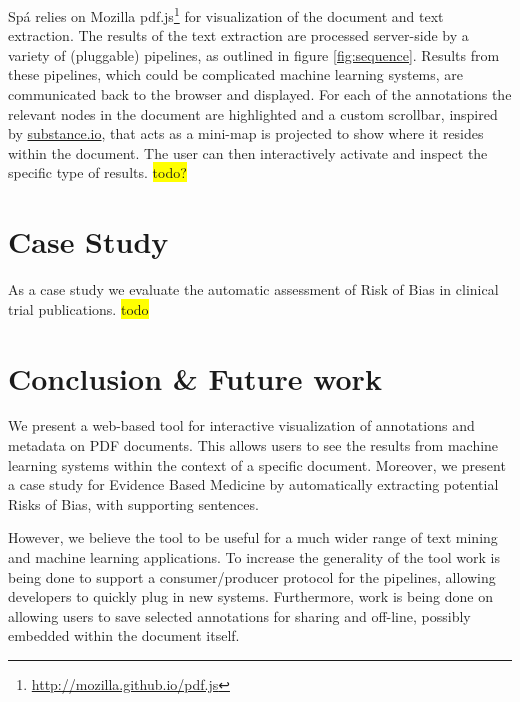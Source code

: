 \documentclass[runningheads,a4paper]{llncs}
\newcommand{\highlight}[1]{\colorbox{yellow}{#1}}
\begin{document}
Spá relies on Mozilla pdf.js\footnote{\url{http://mozilla.github.io/pdf.js}} for visualization of the document and text extraction.
The results of the text extraction are processed server-side by a variety of (pluggable) pipelines, as outlined in figure \ref{fig:sequence}.
Results from these pipelines, which could be complicated machine learning systems, are communicated back to the browser and displayed.
For each of the annotations the relevant nodes in the document are highlighted and a custom scrollbar, inspired by \href{http://substance.io/}{substance.io}, that acts as a mini-map is projected to show where it resides within the document.
The user can then interactively activate and inspect the specific type of results.
\highlight{todo?}
\section{Case Study}
\label{sec-3}
As a case study we evaluate the automatic assessment of Risk of Bias in clinical trial publications.
\highlight{todo}
\section{Conclusion \& Future work}
\label{sec-4}
We present a web-based tool for interactive visualization of annotations and metadata on PDF documents.
This allows users to see the results from machine learning systems within the context of a specific document.
Moreover, we present a case study for Evidence Based Medicine by automatically extracting potential Risks of Bias, with supporting sentences.

However, we believe the tool to be useful for a much wider range of text mining and machine learning applications.
To increase the generality of the tool work is being done to support a consumer/producer protocol for the pipelines, allowing developers to quickly plug in new systems.
Furthermore, work is being done on allowing users to save selected annotations for sharing and off-line, possibly embedded within the document itself.



\end{document}
